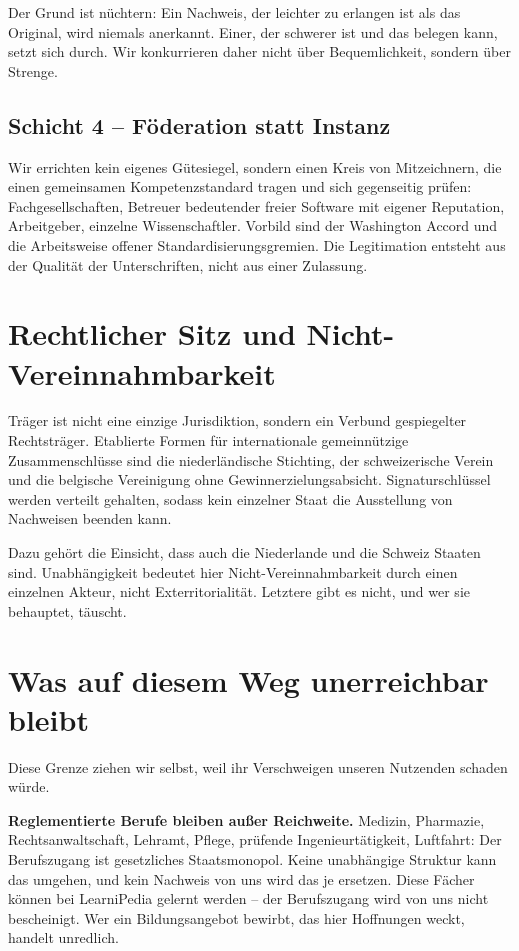 \documentclass[11pt,a4paper]{article}
\begin{document}
Der Grund ist nüchtern: Ein Nachweis, der leichter zu erlangen ist als das Original, wird niemals anerkannt. Einer, der schwerer ist und das belegen kann, setzt sich durch. Wir konkurrieren daher nicht über Bequemlichkeit, sondern über Strenge.

\subsection{Schicht 4 -- Föderation statt Instanz}
Wir errichten kein eigenes Gütesiegel, sondern einen Kreis von Mitzeichnern, die einen gemeinsamen Kompetenzstandard tragen und sich gegenseitig prüfen: Fachgesellschaften, Betreuer bedeutender freier Software mit eigener Reputation, Arbeitgeber, einzelne Wissenschaftler. Vorbild sind der Washington Accord und die Arbeitsweise offener Standardisierungsgremien. Die Legitimation entsteht aus der Qualität der Unterschriften, nicht aus einer Zulassung.

\section{Rechtlicher Sitz und Nicht-Vereinnahmbarkeit}
Träger ist nicht eine einzige Jurisdiktion, sondern ein Verbund gespiegelter Rechtsträger. Etablierte Formen für internationale gemeinnützige Zusammenschlüsse sind die niederländische Stichting, der schweizerische Verein und die belgische Vereinigung ohne Gewinnerzielungsabsicht. Signaturschlüssel werden verteilt gehalten, sodass kein einzelner Staat die Ausstellung von Nachweisen beenden kann.

Dazu gehört die Einsicht, dass auch die Niederlande und die Schweiz Staaten sind. Unabhängigkeit bedeutet hier Nicht-Vereinnahmbarkeit durch einen einzelnen Akteur, nicht Exterritorialität. Letztere gibt es nicht, und wer sie behauptet, täuscht.

\section{Was auf diesem Weg unerreichbar bleibt}
Diese Grenze ziehen wir selbst, weil ihr Verschweigen unseren Nutzenden schaden würde.

\textbf{Reglementierte Berufe bleiben außer Reichweite.} Medizin, Pharmazie, Rechtsanwaltschaft, Lehramt, Pflege, prüfende Ingenieurtätigkeit, Luftfahrt: Der Berufszugang ist gesetzliches Staatsmonopol. Keine unabhängige Struktur kann das umgehen, und kein Nachweis von uns wird das je ersetzen. Diese Fächer können bei LearniPedia gelernt werden -- der Berufszugang wird von uns nicht bescheinigt. Wer ein Bildungsangebot bewirbt, das hier Hoffnungen weckt, handelt unredlich.
\end{document}
